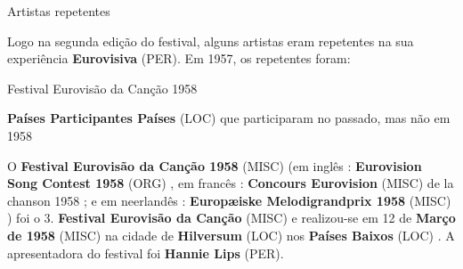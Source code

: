 \documentclass[12pt,a4paper]{article}
\begin{document}
Artistas repetentes

Logo na segunda edição do festival, alguns artistas eram repetentes na sua experiência \textbf{Eurovisiva} (PER). Em 1957, os repetentes foram:



Festival Eurovisão da Canção 1958



\textbf{Países Participantes Países} (LOC) que participaram no passado, mas não em 1958

O \textbf{Festival Eurovisão da Canção 1958} (MISC) (em inglês : \textbf{Eurovision Song Contest 1958} (ORG) , em francês : \textbf{Concours Eurovision} (MISC) de la chanson 1958 ; e em neerlandês : \textbf{Europæiske Melodigrandprix 1958} (MISC) ) foi o 3. \textbf{Festival Eurovisão da Canção} (MISC) e realizou-se em 12 de \textbf{Março de 1958} (MISC) na cidade de \textbf{Hilversum} (LOC) nos \textbf{Países Baixos} (LOC) . A apresentadora do festival foi \textbf{Hannie Lips} (PER).
\end{document}

